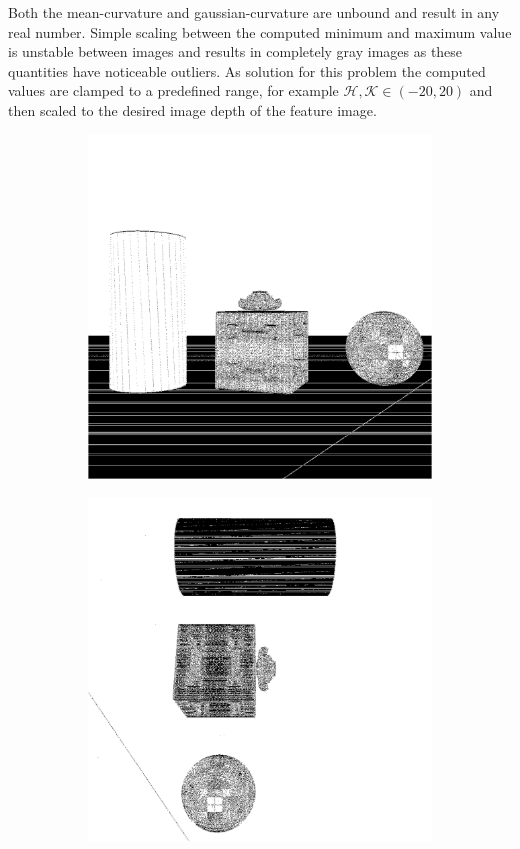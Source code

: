 Both the \gls{mean-curvature} and \gls{gaussian-curvature} are unbound and result in any real number.
Simple scaling between the computed minimum and maximum value is unstable between images and results in completely gray images as these quantities have noticeable outliers.
As solution for this problem the computed values are clamped to a predefined range, for example $\mathcal{H},\mathcal{K} \in (-20, 20)$ and then scaled to the desired image depth of the feature image.
\begin{figure}[tb]
    \begin{subfigure}[t]{0.32\textwidth}
        \includegraphics[width=\linewidth]{chapter04/img/gauss-0001.png}
    \end{subfigure}
    \begin{subfigure}[t]{0.32\textwidth}
        \includegraphics[width=\linewidth]{chapter04/img/gauss-0030.png}

\end{subfigure}
\end{figure}
